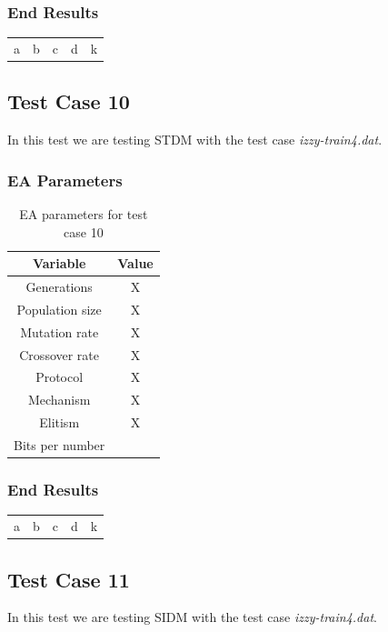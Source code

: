 \subsubsection{End Results}\label{sec:test-case-9-results}
\begin{table}
	\begin{tabular}{c c c c c}
		a & b & c & d & k \\
	\end{tabular}
\end{table}

\subsection{Test Case 10}\label{sec:test-case-10}
In this test we are testing STDM with the test case
\textit{izzy-train4.dat}.
\subsubsection{EA Parameters}\label{sec:test-case-10-parameters}
\begin{table}
	\begin{tabular}{c c}
		Variable & Value \\
		\hline
		Generations & X \\
		\hline
		Population size & X \\
		\hline
		Mutation rate & X \\
		\hline
		Crossover rate & X \\
		\hline
		Protocol & X \\
		\hline
		Mechanism & X \\
		\hline
		Elitism & X \\
		\hline
		Bits per number & \\
	\end{tabular}
	\caption{EA parameters for test case 10}
\end{table}
\subsubsection{End Results}\label{sec:test-case-10-results}
\begin{table}
	\begin{tabular}{c c c c c}
		a & b & c & d & k \\
	\end{tabular}
\end{table}

\subsection{Test Case 11}\label{sec:test-case-11}
In this test we are testing SIDM with the test case
\textit{izzy-train4.dat}.
